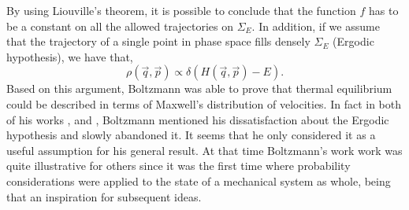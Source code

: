 \indent By using Liouville's theorem, it is possible to conclude that the function $f$ has to be a constant on all the allowed trajectories on $\Sigma_{E}$. In addition, if we assume that the trajectory of a single point in phase space fills densely $\Sigma_E$ (Ergodic hypothesis), we have that, 
\begin{equation}
\rho(\vec{q},\vec{p})\propto \delta(H(\vec{q},\vec{p})-E).
\label{CH1:Liouville_equation}
\end{equation}
Based on this argument, Boltzmann was able to prove that thermal equilibrium could be described in terms of Maxwell's distribution of velocities. In fact in both of his works \cite{boltzmann1871prioritat}, and \cite{boltzmann_einige_1871}, Boltzmann mentioned his dissatisfaction about the Ergodic hypothesis and slowly abandoned it. It seems that he only considered it as a useful assumption for his general result.
\indent At that time Boltzmann's work work was quite illustrative for others since it was the first time where probability considerations were applied to the state of a mechanical system as whole, being that an inspiration for subsequent ideas. 

